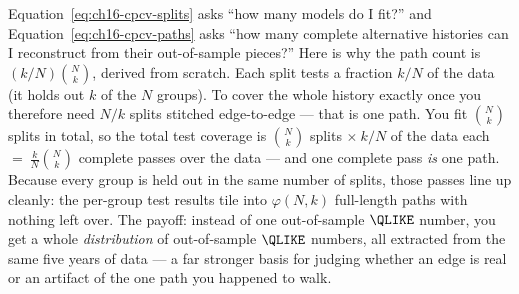 \begin{intuition}
Equation~\eqref{eq:ch16-cpcv-splits} asks ``how many models do I fit?'' and Equation~\eqref{eq:ch16-cpcv-paths} asks ``how many complete alternative histories can I reconstruct from their out-of-sample pieces?''
Here is why the path count is $(k/N)\binom{N}{k}$, derived from scratch.
Each split tests a fraction $k/N$ of the data (it holds out $k$ of the $N$ groups).
To cover the whole history exactly once you therefore need $N/k$ splits stitched edge-to-edge --- that is one path.
You fit $\binom{N}{k}$ splits in total, so the total test coverage is $\binom{N}{k}$ splits $\times\ k/N$ of the data each $=\ \frac{k}{N}\binom{N}{k}$ complete passes over the data --- and one complete pass \emph{is} one path.
Because every group is held out in the same number of splits, those passes line up cleanly: the per-group test results tile into $\varphi(N,k)$ full-length paths with nothing left over.
The payoff: instead of one out-of-sample $\QLIKE$ number, you get a whole \emph{distribution} of out-of-sample $\QLIKE$ numbers, all extracted from the same five years of data --- a far stronger basis for judging whether an edge is real or an artifact of the one path you happened to walk.
\end{intuition}

